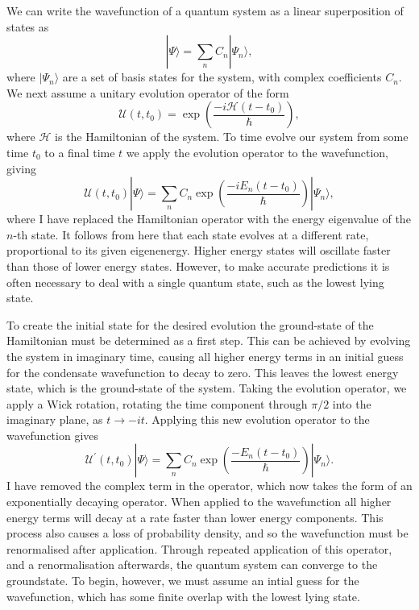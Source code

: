 We can write the wavefunction of a quantum system as a linear superposition of states as
\begin{equation}
     |\Psi \rangle = \displaystyle\sum\limits_{n} C_n |\Psi_n \rangle,
\end{equation}
where $| \Psi_n \rangle$ are a set of basis states for the system, with complex coefficients $C_n$. We next assume a unitary evolution operator of the form
\begin{equation}
    \mathscr{U}(t,t_0) = \exp\left(\frac{-i\mathcal{H}(t-t_0)}{\hbar}\right),
\end{equation}
where $\mathcal{H}$ is the Hamiltonian of the system. To time evolve our system from some time $t_0$ to a final time $t$ we apply the evolution operator to the wavefunction, giving
\begin{equation}
    \mathscr{U}(t,t_0)|\Psi \rangle = \displaystyle\sum\limits_{n} C_n \exp\left(\frac{-i{E_n}(t-t_0)}{\hbar}\right)|\Psi_n \rangle,
\end{equation}
where I have replaced the Hamiltonian operator with the energy eigenvalue of the $n$-th state. It follows from here that each state evolves at a different rate, proportional to its given eigenenergy. Higher energy states will oscillate faster than those of lower energy states. However, to make accurate predictions it is often necessary to deal with a single quantum state, such as the lowest lying state.

To create the initial state for the desired evolution the ground-state of the Hamiltonian must be determined as a first step. This can be achieved by evolving the system in imaginary time, causing all higher energy terms in an initial guess for the condensate wavefunction to decay to zero. This leaves the lowest energy state, which is the ground-state of the system. Taking the evolution operator, we apply a Wick rotation, rotating the time component through $\pi/2$ into the imaginary plane, as $t \rightarrow -it$. Applying this new evolution operator to the wavefunction gives
\begin{equation}
        \mathscr{U^{'}}(t,t_0)|\Psi \rangle = \displaystyle\sum\limits_{n} C_n \exp\left(\frac{-{E_n}(t-t_0)}{\hbar}\right)|\Psi_n \rangle.
\end{equation}
I have removed the complex term in the operator, which now takes the form of an exponentially decaying operator. When applied to the wavefunction all higher energy terms will decay at a rate faster than lower energy components. This process also causes a loss of probability density, and so the wavefunction must be renormalised after application. Through repeated application of this operator, and a renormalisation afterwards, the quantum system can converge to the groundstate. To begin, however, we must assume an intial guess for the wavefunction, which has some finite overlap with the lowest lying state.

